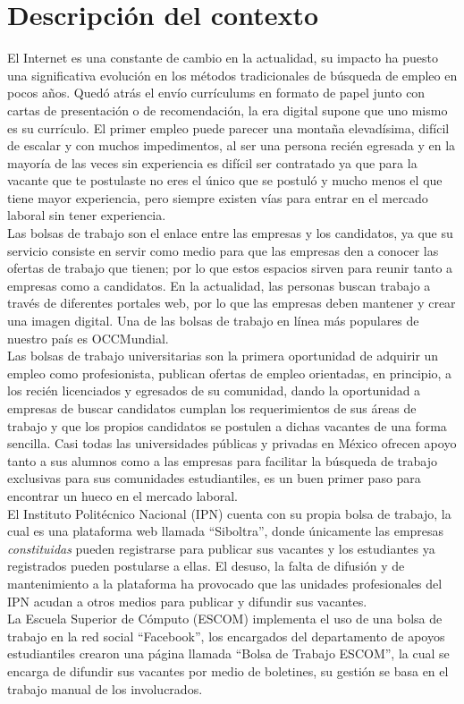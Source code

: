 \section{Descripción del contexto}
El Internet es una constante de cambio en la actualidad, su impacto ha puesto una significativa evolución en los métodos tradicionales de búsqueda de empleo en pocos años. Quedó atrás el envío currículums en formato de papel junto con cartas de presentación o de recomendación, la era digital supone que uno mismo es su currículo.\cite{Evo}
El primer empleo puede parecer una montaña elevadísima, difícil de escalar y con muchos impedimentos, al ser una persona recién egresada y en la mayoría de las veces sin experiencia es difícil ser contratado ya que para la vacante que te postulaste no eres el único que se postuló y mucho menos el que tiene mayor experiencia, pero siempre existen vías para entrar en el mercado laboral sin tener experiencia. \\
\newline
Las bolsas de trabajo son el enlace entre las empresas y los candidatos, ya que su servicio consiste en servir como medio para que las empresas den a conocer las ofertas de trabajo que tienen; por lo que estos espacios sirven para reunir tanto a empresas como a candidatos.\cite{Occ3}
En la actualidad, las personas buscan trabajo a través de diferentes portales web, por lo que las empresas deben mantener y crear una imagen digital. Una de las bolsas de trabajo en línea más populares de nuestro país es OCCMundial.\\
Las bolsas de trabajo universitarias son la primera oportunidad de adquirir un empleo como profesionista, publican ofertas de empleo orientadas, en principio, a los recién licenciados y egresados de su comunidad, dando la oportunidad a empresas de buscar candidatos cumplan los requerimientos de sus áreas de trabajo y que los propios candidatos se postulen a dichas vacantes de una forma sencilla.\cite{Universia}  
Casi todas las universidades públicas y privadas en México ofrecen apoyo tanto a sus alumnos como a las empresas para facilitar la búsqueda de trabajo exclusivas para sus comunidades estudiantiles, es un buen primer paso para encontrar un hueco en el mercado laboral.\\
\newline
El Instituto Politécnico Nacional (IPN) cuenta con su propia bolsa de trabajo, la cual es una plataforma web llamada ``Siboltra'', donde únicamente las empresas \textit{constituidas} pueden registrarse para publicar sus vacantes y los estudiantes ya registrados pueden postularse a ellas. El desuso, la falta de difusión y de mantenimiento a la plataforma ha provocado que las unidades profesionales del IPN acudan a otros medios para publicar y difundir sus vacantes.\cite{Siboltra} \\
La Escuela Superior de Cómputo (ESCOM) implementa el uso de una bolsa de trabajo en la red social ``Facebook'', los encargados del departamento
de apoyos estudiantiles crearon una página llamada ``Bolsa de Trabajo ESCOM'', la cual se encarga de difundir sus vacantes por medio 
de boletines, su gestión se basa en el trabajo manual de los involucrados. 

